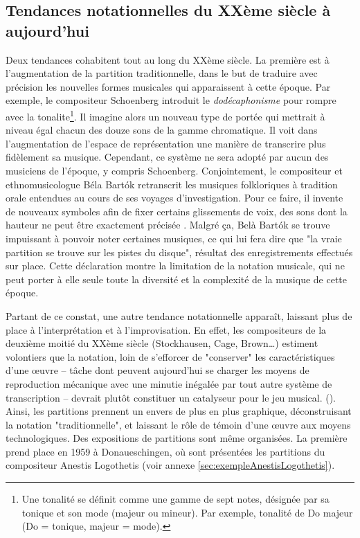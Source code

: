 \subsection{Tendances notationnelles du XXème siècle à aujourd'hui}
\label{subsec:tendancesNotationnellesXX}
Deux tendances cohabitent tout au long du XXème siècle. 
La première est à l'augmentation de la partition traditionnelle, dans le but de traduire avec précision les nouvelles formes musicales qui apparaissent à cette époque.
Par exemple, le compositeur Schoenberg introduit le \textit{dodécaphonisme} pour rompre avec la \gls{tonalite}\footnote{Une tonalité se définit comme une gamme de sept notes, désignée par sa tonique et son mode (majeur ou mineur). Par exemple, tonalité de Do majeur (Do = tonique, majeur = mode).}. Il imagine alors un nouveau type de portée qui mettrait à niveau égal chacun des douze sons de la gamme chromatique. Il voit dans l'augmentation de l'espace de représentation une manière de transcrire plus fidèlement sa musique. Cependant, ce système ne sera adopté par aucun des musiciens de l'époque, y compris Schoenberg.
Conjointement, le compositeur et ethnomusicologue Béla Bart\'{o}k retranscrit les musiques folkloriques à tradition orale entendues au cours de ses voyages d'investigation. Pour ce faire, il invente de nouveaux symboles afin de fixer \og certains glissements de voix, des sons dont la hauteur ne peut être exactement précisée \fg \cite[94]{bosseur2005}.
Malgré ça, Belà Bart\'{o}k se trouve impuissant à pouvoir noter certaines musiques, ce qui lui fera dire que "la vraie partition se trouve sur les pistes du disque", résultat des enregistrements effectués sur place.
Cette déclaration montre la limitation de la notation musicale, qui ne peut porter à elle seule toute la diversité et la complexité de la musique de cette époque.

Partant de ce constat, une autre tendance notationnelle apparaît, laissant plus de place à l'interprétation et à l'improvisation. 
En effet, les compositeurs de la deuxième moitié du XXème siècle (Stockhausen, Cage, Brown…) \og estiment volontiers que la notation, loin de s'efforcer de "conserver" les caractéristiques d'une œuvre -- tâche dont peuvent aujourd'hui se charger les moyens de reproduction mécanique avec une minutie inégalée par tout autre système de transcription -- devrait plutôt constituer un catalyseur pour le jeu musical. \fg (\cite[115]{bosseur2005}).
Ainsi, les partitions prennent un envers de plus en plus graphique, déconstruisant la notation "traditionnelle", et laissant le rôle de témoin d'une œuvre aux moyens technologiques.
Des expositions de partitions sont même organisées. La première prend place en 1959 à Donaueschingen, où sont présentées les partitions du compositeur Anestis Logothetis (voir annexe \ref{sec:exempleAnestisLogothetis}).

